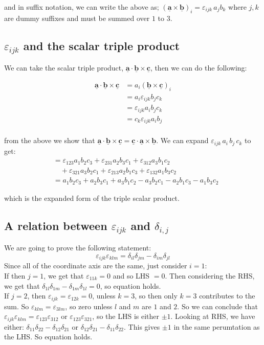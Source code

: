 \documentclass{article}
\renewcommand{\vec}[1]{\underline{\textbf{#1}}}
\newcommand{\e}{\varepsilon}
\newcommand{\kd}{\delta_{i, j}}
\begin{document}
and in suffix notation, we can write the above as; $(\vec a \times \vec b)_i = \e_{ijk} \, a_jb_k $ where $j, k$ are dummy suffixes and must be summed over $1$ to $3$.

\subsection{$\e_{ijk}$ and the scalar triple product}

We can take the scalar triple product, $\vec a \cdot \vec b \times \vec c$, then we can do the following:

\begin{align*}
  \vec a \cdot \vec b \times \vec c &= a_i (\vec b \times \vec c)_i\\
  &= a_i \e_{ijk} b_j c_k \\
  &= \e_{ijk} a_i b_j c_k \\
  &= c_k \e_{ijk} a_i b_j \\
\end{align*}

from the above we show that $\vec a \cdot \vec b \times \vec c = \vec c \cdot \vec a \times \vec b $. We can expand $\e_{ijk}\, a_i\, b_j\, c_k$ to get:
\begin{align*}
  &= \e_{123}a_1b_2c_3 + \e_{231}a_2b_3c_1 + \e_{312}a_3b_1c_2 \\
  &\quad+ \e_{321}a_3b_2c_1 + \e_{213}a_2b_1c_3 + \e_{132}a_1b_3c_2 \\
  &= a_1b_2c_3 + a_2b_3c_1 + a_3b_1c_2 - a_3b_2c_1 - a_2b_1c_3 - a_1b_3c_2
\end{align*}

which is the expanded form of the triple scalar product.

\subsection{A relation between $\e_{ijk}$ and $\kd$}
We are going to prove the following statement:
$$ \e_{ijk}\e_{klm} = \delta_{il}\delta_{jm} - \delta_{im}\delta_{jl} $$
Since all of the coordinate axis are the same, just consider $\displaystyle{i = 1}$:\\

\noindent
If then $\displaystyle{j = 1}$, we get that $\displaystyle{\e_{11k} = 0}$ and so LHS $\displaystyle{= 0}$. Then considering the RHS, we get that $\displaystyle{\delta_{1l}\delta_{1m} - \delta_{1m}\delta_{1l} = 0}$, so equation holds.\\

\noindent
If $\displaystyle{j=2}$, then $\displaystyle{\e_{ijk} = {\e_{12k} = 0}}$, unless $\displaystyle{k=3}$, so then only $\displaystyle{k=3}$ contributes to the sum. So $\displaystyle{\e_{klm} = \e_{3lm}}$, so zero unless $l$ and $m$ are $1$ and $2$. So we can conclude that $\displaystyle{\e_{ijk}\e_{klm} = \e_{123}\e_{312}}$ or $\e_{123}\e_{321}$, so the LHS is either $\pm 1$. Looking at RHS, we have either: $\delta_{11}\delta_{22} - \delta_{12}\delta_{21}$ or $\delta_{12}\delta_{21} - \delta_{11}\delta_{22}$. This gives $\pm 1$ in the same perumtation as the LHS. So equation holds.
\end{document}
